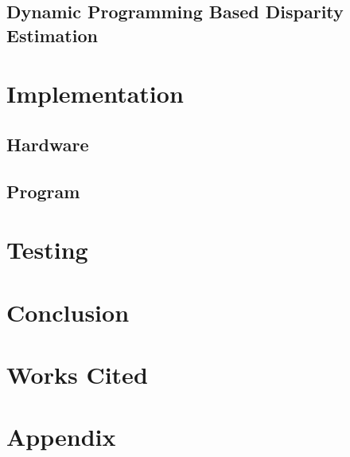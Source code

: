 \documentclass[11pt]{scrartcl}
\begin{document}
\subsection{Dynamic Programming Based Disparity Estimation}

\section{Implementation}

\subsection{Hardware}
\subsection{Program}

\section{Testing}

\section{Conclusion}

\section{Works Cited}

\section{Appendix}
\end{document}
